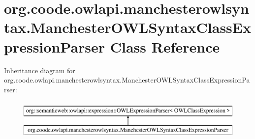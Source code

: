 \hypertarget{classorg_1_1coode_1_1owlapi_1_1manchesterowlsyntax_1_1_manchester_o_w_l_syntax_class_expression_parser}{\section{org.\-coode.\-owlapi.\-manchesterowlsyntax.\-Manchester\-O\-W\-L\-Syntax\-Class\-Expression\-Parser Class Reference}
\label{classorg_1_1coode_1_1owlapi_1_1manchesterowlsyntax_1_1_manchester_o_w_l_syntax_class_expression_parser}
}
Inheritance diagram for org.\-coode.\-owlapi.\-manchesterowlsyntax.\-Manchester\-O\-W\-L\-Syntax\-Class\-Expression\-Parser\-:\begin{figure}[H]
\begin{center}
\leavevmode
\includegraphics[height=2.000000cm]{classorg_1_1coode_1_1owlapi_1_1manchesterowlsyntax_1_1_manchester_o_w_l_syntax_class_expression_parser}
\end{center}
\end{figure}
